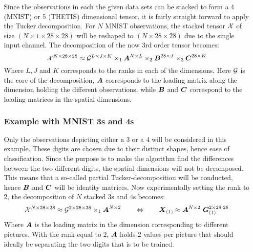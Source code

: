 Since the observations in each the given data sets can be stacked to form a 4 (MNIST) or 5 (THETIS) dimensional tensor, it is fairly straight forward to apply the Tucker decomposition. For $N$ MNIST observations, the stacked tensor $\mathcal{X}$ of size $(N \times 1 \times 28 \times 28)$ will be reshaped to $(N\times 28 \times 28)$ due to the single input channel. The decomposition of the now 3rd order tensor becomes:
\begin{equation}
    \mathcal{X}^{N\times 28 \times 28} \approx \mathcal{G}^{L\times J \times K} \times_1 \boldsymbol{A}^{N\times L} \times_2 \boldsymbol{B}^{28 \times J} \times_3 \boldsymbol{C}^{28 \times K}
\end{equation}
Where $L, J$ and $K$ corresponds to the ranks in each of the dimensions. Here $\mathcal{G}$ is the core of the decomposition, $\boldsymbol{A}$ corresponds to the loading matrix along the dimension holding the different observations, while $\boldsymbol{B}$ and $\boldsymbol{C}$ correspond to the loading matrices in the spatial dimensions.

\subsubsection{Example with MNIST 3s and 4s}
Only the observations depicting either a 3 or a 4 will be considered in this example. These digits are chosen due to their distinct shapes, hence ease of classification. Since the purpose is to make the algorithm find the differences between the two different digits, the spatial dimensions will not be decomposed. This means that a so-called partial Tucker-decomposition will be conducted, hence $\boldsymbol{B}$ and $\boldsymbol{C}$ will be identity matrices. Now experimentally setting the rank to 2, the decomposition of $N$ stacked 3s and 4s becomes:
\begin{equation}
    \tensor{X}^{N\times 28\times 28} \approx \tensor{G}^{2 \times 28 \times 28} \times_1 \bs{A}^{N\times 2} \qquad \Leftrightarrow \qquad \bs{X}_{(1)} \approx \bs{A}^{N\times 2} \ \bs{G}^{2 \times 28\cdot 28}_{(1)}
\end{equation}
Where $\boldsymbol{A}$ is the loading matrix in the dimension corresponding to different pictures. With the rank equal to 2, $\boldsymbol{A}$ holds 2 values per picture that should ideally be separating the two digits that is to be trained. 
